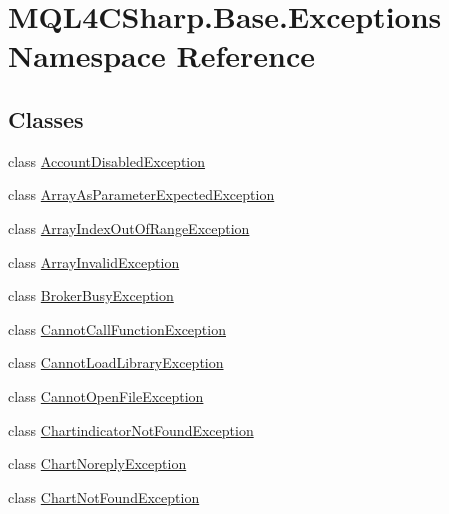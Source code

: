 \hypertarget{namespace_m_q_l4_c_sharp_1_1_base_1_1_exceptions}{}\section{M\+Q\+L4\+C\+Sharp.\+Base.\+Exceptions Namespace Reference}
\label{namespace_m_q_l4_c_sharp_1_1_base_1_1_exceptions}
\subsection*{Classes}
\begin{DoxyCompactItemize}
\item 
class \hyperlink{class_m_q_l4_c_sharp_1_1_base_1_1_exceptions_1_1_account_disabled_exception}{Account\+Disabled\+Exception}
\item 
class \hyperlink{class_m_q_l4_c_sharp_1_1_base_1_1_exceptions_1_1_array_as_parameter_expected_exception}{Array\+As\+Parameter\+Expected\+Exception}
\item 
class \hyperlink{class_m_q_l4_c_sharp_1_1_base_1_1_exceptions_1_1_array_index_out_of_range_exception}{Array\+Index\+Out\+Of\+Range\+Exception}
\item 
class \hyperlink{class_m_q_l4_c_sharp_1_1_base_1_1_exceptions_1_1_array_invalid_exception}{Array\+Invalid\+Exception}
\item 
class \hyperlink{class_m_q_l4_c_sharp_1_1_base_1_1_exceptions_1_1_broker_busy_exception}{Broker\+Busy\+Exception}
\item 
class \hyperlink{class_m_q_l4_c_sharp_1_1_base_1_1_exceptions_1_1_cannot_call_function_exception}{Cannot\+Call\+Function\+Exception}
\item 
class \hyperlink{class_m_q_l4_c_sharp_1_1_base_1_1_exceptions_1_1_cannot_load_library_exception}{Cannot\+Load\+Library\+Exception}
\item 
class \hyperlink{class_m_q_l4_c_sharp_1_1_base_1_1_exceptions_1_1_cannot_open_file_exception}{Cannot\+Open\+File\+Exception}
\item 
class \hyperlink{class_m_q_l4_c_sharp_1_1_base_1_1_exceptions_1_1_chartindicator_not_found_exception}{Chartindicator\+Not\+Found\+Exception}
\item 
class \hyperlink{class_m_q_l4_c_sharp_1_1_base_1_1_exceptions_1_1_chart_noreply_exception}{Chart\+Noreply\+Exception}
\item 
class \hyperlink{class_m_q_l4_c_sharp_1_1_base_1_1_exceptions_1_1_chart_not_found_exception}{Chart\+Not\+Found\+Exception}

\end{DoxyCompactItemize}
